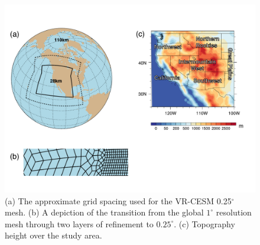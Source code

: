 \documentclass{ametsoc}
\begin{document}
\begin{figure}
\begin{center}
\includegraphics[width=5in]{gridmesh_mod.pdf}
\caption{(a) The approximate grid spacing used for the VR-CESM 0.25$^\circ$ mesh. (b) A depiction of the transition from the global $1^\circ$ resolution mesh through two layers of refinement to $0.25^\circ$. (c) Topography height over the study area.}
\label{fig:gridmesh}
\end{center}
\end{figure}  
\end{document}
